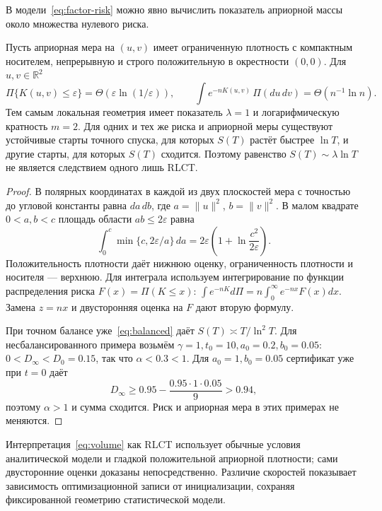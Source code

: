В модели~\eqref{eq:factor-risk} можно явно вычислить показатель априорной
массы около множества нулевого риска.

\begin{proposition}
\label{prop:rlct-counterexample}
Пусть априорная мера на $(u,v)$ имеет ограниченную плотность с компактным носителем,
непрерывную и строго положительную в окрестности $(0,0)$.
Для $u,v\in\mathbb R^2$
\begin{equation}
 \Pi\{K(u,v)\le\varepsilon\}
  =\Theta(\varepsilon\ln(1/\varepsilon)),\qquad
 \int e^{-nK(u,v)}\,\Pi(du\,dv)=\Theta(n^{-1}\ln n).
 \label{eq:volume}
\end{equation}
Тем самым локальная геометрия имеет показатель $\lambda=1$ и логарифмическую
кратность $m=2$. Для одних и тех же риска и априорной меры существуют устойчивые
старты точного спуска, для которых $S(T)$ растёт быстрее $\ln T$, и другие
старты, для которых $S(T)$ сходится. Поэтому равенство
$S(T)\sim\lambda\ln T$ не является следствием одного лишь RLCT.
\end{proposition}
\begin{proof}
В полярных координатах в каждой из двух плоскостей мера с точностью до
угловой константы равна $da\,db$, где $a=\|u\|^2$, $b=\|v\|^2$.
В малом квадрате $0<a,b<c$ площадь области $ab\le2\varepsilon$ равна
\[
 \int_0^c\min\{c,2\varepsilon/a\}\,da
 =2\varepsilon\left(1+\ln\frac{c^2}{2\varepsilon}\right).
\]
Положительность плотности даёт нижнюю оценку, ограниченность плотности и
носителя --- верхнюю. Для интеграла используем интегрирование по функции
распределения риска $F(x)=\Pi(K\le x)$:
$\int e^{-nK}d\Pi=n\int_0^\infty e^{-nx}F(x)dx$.
Замена $z=nx$ и двусторонняя оценка на $F$ дают вторую формулу.

При точном балансе уже~\eqref{eq:balanced} даёт
$S(T)\asymp T/\ln^2T$. Для несбалансированного примера возьмём
$\gamma=1,t_0=10,a_0=0.2,b_0=0.05$:
$0<D_\infty<D_0=0.15$, так что $\alpha<0.3<1$.
Для $a_0=1,b_0=0.05$ сертификат уже при $t=0$ даёт
\[
 D_\infty\ge0.95-\frac{0.95\cdot1\cdot0.05}{9}>0.94,
\]
поэтому $\alpha>1$ и сумма сходится. Риск и априорная мера в этих примерах не меняются.
\end{proof}

Интерпретация~\eqref{eq:volume} как RLCT использует обычные условия
аналитической модели и гладкой положительной априорной плотности; сами двусторонние
оценки доказаны непосредственно. Различие скоростей показывает зависимость
оптимизационной записи от инициализации, сохраняя фиксированной геометрию
статистической модели.
